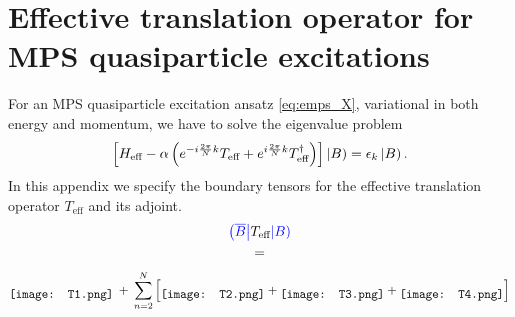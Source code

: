 \newpage
\section*{Effective translation operator for MPS quasiparticle excitations}
For an MPS quasiparticle excitation ansatz \eqref{eq:emps_X}, variational in both energy and momentum, we have to solve the eigenvalue problem
\begin{equation*}
	\left[ H_{\text{eff}} - \alpha \left( e^{-i \frac{2\pi}{N}k} T_{\text{eff}} + e^{i \frac{2\pi}{N}k} T_{\text{eff}}^{\dagger} \right) \right] 
	 \left| B \right) 
	 = \epsilon_k \left| B \right).
\end{equation*}
In this appendix we specify the boundary tensors for the effective translation operator $T_{\text{eff}}$ and its adjoint. \\[1.5em]

\begin{align*}
\begin{split}
	\textcolor{blue}{\left( \overline{B} \right|} &T_{\text{eff}} \textcolor{blue}{\left| B \right)} \\
	&=
\end{split}
\end{align*}
\vspace*{-0.5cm}
\begin{equation*}
	\raisebox{-0.45\height}{\texttt{[image: T1.png]}} 
	\:+\: \sum_{n=2}^N \left[
	\raisebox{-0.45\height}{\texttt{[image: T2.png]}}
	+
	\raisebox{-0.45\height}{\texttt{[image: T3.png]}} 
	+ 
	\raisebox{-0.45\height}{\texttt{[image: T4.png]}} 
	\right]
\end{equation*}

\vspace*{2em}

